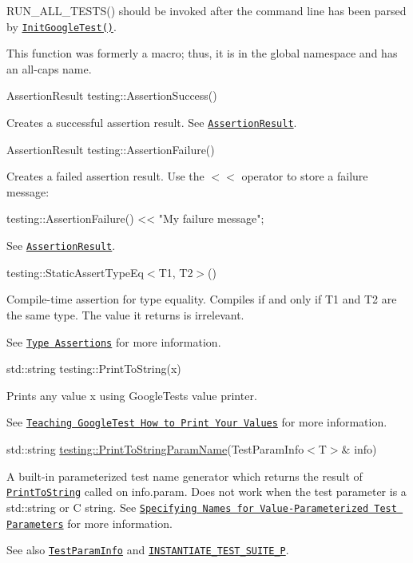 {\ttfamily R\+U\+N\+\_\+\+A\+L\+L\+\_\+\+T\+E\+S\+T\+S()} should be invoked after the command line has been parsed by \href{#InitGoogleTest}{\tt {\ttfamily Init\+Google\+Test()}}.

This function was formerly a macro; thus, it is in the global namespace and has an all-\/caps name.

{\ttfamily Assertion\+Result testing\+::\+Assertion\+Success()}

Creates a successful assertion result. See \href{#AssertionResult}{\tt {\ttfamily Assertion\+Result}}.

{\ttfamily Assertion\+Result testing\+::\+Assertion\+Failure()}

Creates a failed assertion result. Use the {\ttfamily $<$$<$} operator to store a failure message\+:


\begin{DoxyCode}
testing::AssertionFailure() << \textcolor{stringliteral}{"My failure message"};
\end{DoxyCode}


See \href{#AssertionResult}{\tt {\ttfamily Assertion\+Result}}.

{\ttfamily testing\+::\+Static\+Assert\+Type\+Eq$<$T1, T2$>$()}

Compile-\/time assertion for type equality. Compiles if and only if {\ttfamily T1} and {\ttfamily T2} are the same type. The value it returns is irrelevant.

See \href{../advanced.md#type-assertions}{\tt Type Assertions} for more information.

{\ttfamily std\+::string testing\+::\+Print\+To\+String(x)}

Prints any value {\ttfamily x} using Google\+Test\textquotesingle{}s value printer.

See \href{../advanced.md#teaching-googletest-how-to-print-your-values}{\tt Teaching Google\+Test How to Print Your Values} for more information.

{\ttfamily std\+::string \mbox{\hyperlink{structtesting_1_1PrintToStringParamName}{testing\+::\+Print\+To\+String\+Param\+Name}}(Test\+Param\+Info$<$T$>$\& info)}

A built-\/in parameterized test name generator which returns the result of \href{#PrintToString}{\tt {\ttfamily Print\+To\+String}} called on {\ttfamily info.\+param}. Does not work when the test parameter is a {\ttfamily std\+::string} or C string. See \href{../advanced.md#specifying-names-for-value-parameterized-test-parameters}{\tt Specifying Names for Value-\/\+Parameterized Test Parameters} for more information.

See also \href{#TestParamInfo}{\tt {\ttfamily Test\+Param\+Info}} and \href{#INSTANTIATE_TEST_SUITE_P}{\tt {\ttfamily I\+N\+S\+T\+A\+N\+T\+I\+A\+T\+E\+\_\+\+T\+E\+S\+T\+\_\+\+S\+U\+I\+T\+E\+\_\+P}}. 